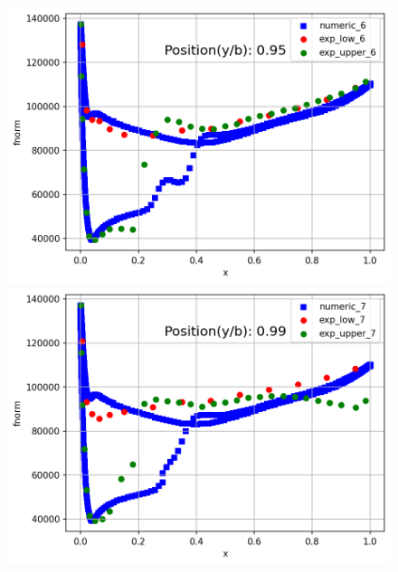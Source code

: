 \documentclass[11pt]{article}
\begin{document}
\begin{figure}[h!]
\begin{minipage}{.49\textwidth}
\end{minipage}
\begin{minipage}{.49\textwidth}
    \centering
    \includegraphics[width = 1\textwidth]{6.png}
\end{minipage}
\begin{minipage}{.49\textwidth}
    \centering
    \includegraphics[width = 1\textwidth]{7.png}
\end{minipage}
\end{figure}
\end{document}
